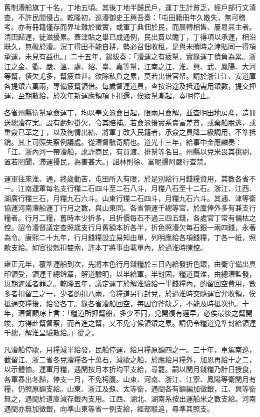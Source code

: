 \begin{pinyinscope}
舊制漕船旗丁十名，丁地五頃。其後丁地半歸民戶，運丁生計貧乏，經戶部行文清查，不許民間侵占。乾隆初，巡漕御史王興吾奏：「屯田籍冊年久散失，無可稽考。亦有冊籍僅存而界址難於徵實，或軍丁典佃於民，而展轉相售、屢易其主者。清田歸運，徒滋擾累。蓋津貼之舉已成通例，民出費以贍丁，丁得項以承運，相沿既久，無礙於漕。況丁得田不能自耕，勢必召佃收租，是與未贖時之津貼同一得項承運，未見有益也。」二十五年，錫紱奏：「漕運之有疲幫，實緣運丁債負為累。浙江之金、衢、嚴、溫、處、紹、臺、嘉等幫，江南之江、淮、興、武、鳳陽、大河等幫，債欠尤多，幫疲益甚。欲除私負之累，莫若出借官帑。請於浙江江、安道庫各提銀六萬兩，專備疲幫領借。每歲督運道員，查按沿途及抵通需用銀數，提交押運，至期散給，於次年新運應領項下扣還，俟疲幫漸起，奏明停止。

各省州縣衛幫承僉運丁，均以奉文派僉日起，限兩月僉解，並查明田地房產，造冊送總漕存案。設有虧短掛欠，令其賠補。若僉派後實系賣富差貧，或棄船脫逃，或重僉已革之丁，以及徇情出結、將軍丁改入民籍者，承僉之員降二級調用，不準抵銷。其上司照失察例議處。從漕督毓奇請也。道光十三年，給事中金應麟奏：「江、浙內河一帶漕船，訛詐商民，有買渡、排幫等名目。州縣以兌米畏其挑剔，置若罔聞，滯運擾民，為害甚大。」詔林則徐、富呢揚阿嚴行查禁。

運軍往來淮、通，終歲勤苦，屯田所入有限，於是別給行月錢糧資用，其數各省不一。江南運軍每名支行糧二石四斗至二石八斗，月糧八石至十二石。浙江、江西、湖廣行糧三石，月糧九石六斗。山東行糧二石四斗，月糧九石六斗。其通、津等衛協運河南漕船運丁行月之數，與山東同。各省領運千總等官，於廩俸外多有兼支行糧者。行月二糧，舊時本少折多，且折價每石不過三四五錢，各處官丁常有偏枯之控。詔令漕督議定查照歲支行月舊額本折各半，折色照漕欠每石銀一兩四錢，永著為令。康熙二十九年，行月錢糧設立易知由單，列明應給各項錢糧，丁各一紙，照款支給。如官役剋扣婪索，許本丁將事由載單內，於過淮時陳控。

雍正元年，覆準運船到次，先將本色行月錢糧於三日內給發折色銀，由衛守備出具印領受，領運千總鈐章，解道驗明，以半給軍，半封固，糧道賚淮，由總漕監發，愆期遲延者罪之。乾隆五年，議定運丁於解淮驗給一半錢糧內，酌留回空費用，數多者扣留三之一，少者酌扣八兩，令糧道另行封兌，於過淮時交隨運官弁收領，俟抵通交糧後，給發各丁。緣各省漕船回空，每因資斧缺乏，不能及時抵次也。十年，漕督顧琮上言：「糧道所押幫船，多少不同，兌開復有遲早，必俟最後之幫開竣，方得赴幫督察，而首進之幫，又不免守候領銀之累。請仍令糧道兌準封給領運千總，解淮呈驗散給。」從之。

凡漕船停歇，月糧減半給發，民船停運，給月糧原額四之一。三十年，車駕南巡，截留江、浙二省冬兌漕糧各十萬石，減歇之船，於應給月糧外，加恩再給十之二，以示體恤。運軍月糧，遇閏按月本折均平支給，尋罷。嗣以閏月錢糧乃計日授食，各軍春出冬歸，停支一月，不免枵腹。山東、河南、浙江、江寧、鳳陽等衛閏月有糧，仍照原額支給。山東、浙江及蘇、太等衛，遇閏各有額編加徵銀，江、興等衛無之，遇閏於道庫減存銀內支用。江西、湖北、湖南系按出運船米之數支給。河南遇閏亦無加徵銀，向準山東等省一例支給，經部駁追，尋準其照支。


\end{pinyinscope}
